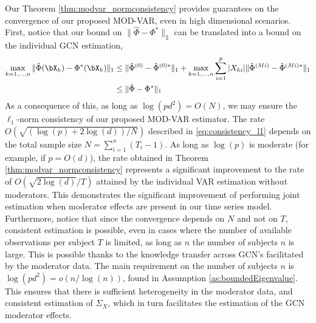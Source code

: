 Our Theorem \ref{thm:modvar_normconsistency} provides guarantees on the convergence of our proposed MOD-VAR, even in high dimensional scenarios. First, notice that our bound on $\|\hat\Phi - \Phi^*\|_2$ can be translated into a bound on the individual GCN estimation,
\begin{align*}
	\max_{k=1,...,n} \|\hat\Phi(\bX_k) - \Phi^*(\bX_k) \|_1 &\leq  \|\hat\Phi^{(0)} - \hat\Phi^{(0)*}\|_1 + \max_{k=1,...,n} \sum_{i=1}^p |X_{ki}| \|\hat\Phi^{(Mi)} - \hat\Phi^{(Mi)*}\|_1\\
	&\leq \| \hat \Phi - \Phi^*\|_1
\end{align*}
As a consequence of this, as long as $\log(pd^2)= O(N)$, we may ensure the $\ell_1$-norm consistency of our proposed MOD-VAR estimator. The rate $O(\sqrt{(\log(p) +2\log(d))/N})$ described in \eqref{eq:consistency_l1} depends on the total sample size $N = \sum_{i=1}^n(T_i - 1)$. As long as $\log(p)$ is moderate (for example, if $p = O(d)$), the rate obtained in Theorem \ref{thm:modvar_normconsistency} represents a significant improvement to the rate of $O(\sqrt{2\log(d)}/T)$ attained by the individual VAR estimation without moderators. This demonstrates the significant improvement of performing joint estimation when moderator effects are present in our time series model. Furthermore, notice that since the convergence depends on $N$ and not on $T$, consistent estimation is possible, even in cases where the number of available observations per subject $T$ is limited, as long as $n$ the number of subjects $n$ is large. This is possible thanks to the knowledge transfer across GCN's facilitated by the moderator data. The main requirement on the number of subjects $n$ is $\log(pd^2) = o(n / \log(n))$, found in Assumption \ref{as:boundedEigenvalue}. This ensures that there is sufficient heterogeneity in the moderator data, and consistent estimation of $\Sigma_{X}$, which in turn facilitates the estimation of the GCN moderator effects.




